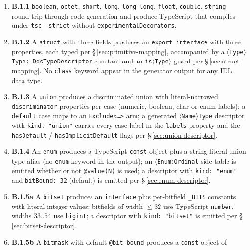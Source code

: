 \documentclass{../styles/zerodds-vendor-spec}
\begin{document}
\begin{enumerate}
  \item \textbf{B.1.1} \texttt{boolean}, \texttt{octet},
        \texttt{short}, \texttt{long}, \texttt{long long},
        \texttt{float}, \texttt{double}, \texttt{string}
        round-trip through code generation and produce TypeScript
        that compiles under \texttt{tsc --strict} without
        \texttt{experimentalDecorators}.
  \item \textbf{B.1.2} A \texttt{struct} with three fields produces
        an \texttt{export interface} with three properties, each
        typed per \S\,\ref{sec:primitive-mapping}, accompanied by
        a \texttt{$\langle$Type$\rangle$Type:\,DdsTypeDescriptor}
        constant and an \texttt{is$\langle$Type$\rangle$} guard
        per \S\,\ref{sec:struct-mapping}. No \texttt{class}
        keyword  appear in the generator output for
        any IDL data type.
  \item \textbf{B.1.3} A \texttt{union} produces a discriminated
        union with literal-narrowed \texttt{discriminator}
        properties per case (numeric, boolean, char or enum
        labels); a \texttt{default} case maps to an
        \texttt{Exclude<\ldots>} arm; a generated
        \texttt{$\langle$Name$\rangle$Type} descriptor with
        \texttt{kind:\,"union"} carries every case label in the
        \texttt{labels} property and the \texttt{hasDefault} /
        \texttt{hasImplicitDefault} flags per
        \S\,\ref{sec:union-descriptor}.
  \item \textbf{B.1.4} An \texttt{enum} produces a TypeScript
        \texttt{const} object plus a string-literal-union type
        alias (no \texttt{enum} keyword in the output); an
        \texttt{$\langle$Enum$\rangle$Ordinal} side-table is
        emitted whether or not \texttt{@value(N)} is used; a
        descriptor with \texttt{kind:\,"enum"} and
        \texttt{bitBound:\,32} (default) is emitted per
        \S\,\ref{sec:enum-descriptor}.
  \item \textbf{B.1.5a} A \texttt{bitset} produces an
        \texttt{interface} plus per-bitfield \texttt{\_BITS}
        constants with literal integer values; bitfields of width
        $\leq 32$ use TypeScript \texttt{number}, widths $33..64$
        use \texttt{bigint}; a descriptor with
        \texttt{kind:\,"bitset"} is emitted per
        \S\,\ref{sec:bitset-descriptor}.
  \item \textbf{B.1.5b} A \texttt{bitmask} with default
        \texttt{@bit\_bound} produces a \texttt{const} object of

\end{enumerate}
\end{document}
